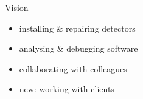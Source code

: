 \begin{frame}{Vision}
%
  \begin{minipage}[c][.4\textheight]{.6\textwidth}
    \begin{itemize}\itemfill
      \item installing \& repairing detectors
      \item analysing \& debugging software
      \item collaborating with colleagues
      \item new: working with clients
    \end{itemize}
  \end{minipage}
  \begin{minipage}{.35\textwidth}
  \end{minipage}
%
\end{frame}
